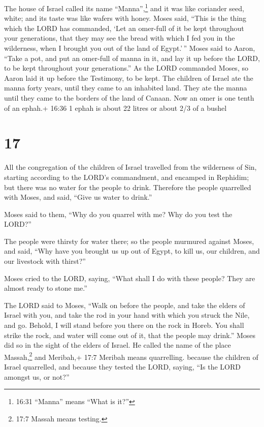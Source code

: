  The house of Israel called its name ``Manna'',\footnote{16:31
  ``Manna'' means ``What is it?''} and it was like coriander seed,
white; and its taste was like wafers with honey.  Moses
said, ``This is the thing which the LORD has commanded, `Let an
omer-full of it be kept throughout your generations, that they may see
the bread with which I fed you in the wilderness, when I brought you out
of the land of Egypt.'\,''  Moses said to Aaron, ``Take a
pot, and put an omer-full of manna in it, and lay it up before the LORD,
to be kept throughout your generations.''  As the LORD
commanded Moses, so Aaron laid it up before the Testimony, to be kept.
 The children of Israel ate the manna forty years, until
they came to an inhabited land. They ate the manna until they came to
the borders of the land of Canaan.  Now an omer is one
tenth of an ephah.+ 16:36 1 ephah is about 22 litres or about 2/3 of a
bushel

\hypertarget{section-16}{%
\section{17}\label{section-16}}

 All the congregation of the children of Israel travelled
from the wilderness of Sin, starting according to the LORD's
commandment, and encamped in Rephidim; but there was no water for the
people to drink.  Therefore the people quarrelled with
Moses, and said, ``Give us water to drink.''

Moses said to them, ``Why do you quarrel with me? Why do you test the
LORD?''

 The people were thirsty for water there; so the people
murmured against Moses, and said, ``Why have you brought us up out of
Egypt, to kill us, our children, and our livestock with thirst?''

 Moses cried to the LORD, saying, ``What shall I do with
these people? They are almost ready to stone me.''

 The LORD said to Moses, ``Walk on before the people, and
take the elders of Israel with you, and take the rod in your hand with
which you struck the Nile, and go.  Behold, I will stand
before you there on the rock in Horeb. You shall strike the rock, and
water will come out of it, that the people may drink.'' Moses did so in
the sight of the elders of Israel.  He called the name of
the place Massah,\footnote{17:7 Massah means testing.} and Meribah,+
17:7 Meribah means quarrelling. because the children of Israel
quarrelled, and because they tested the LORD, saying, ``Is the LORD
amongst us, or not?''

